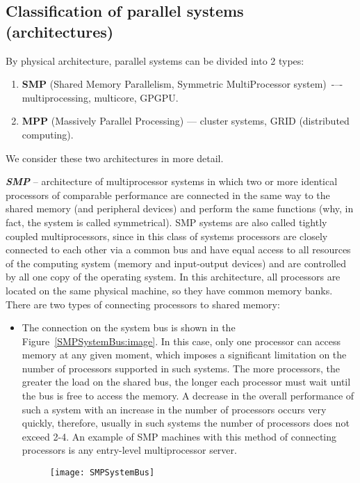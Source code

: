 { %
	\subsection{Classification of parallel systems (architectures)}
	\par By physical architecture, parallel systems can be divided into 2 types:
		\begin{enumerate}
			\item\textbf{SMP} (Shared Memory Parallelism, Symmetric MultiProcessor system)~-–- multiprocessing, multicore, GPGPU. 
			\item\textbf{MPP} (Massively Parallel Processing) –-- cluster systems, GRID (distributed computing).
		\end{enumerate}
	\par We consider these two architectures in more detail.
	\par\textbf{\textit{SMP}}  -- architecture of multiprocessor systems in which two or more identical processors of comparable performance are connected in the same way to the shared memory (and peripheral devices) and perform the same functions (why, in fact, the system is called symmetrical). SMP systems are also called tightly coupled multiprocessors, since in this class of systems processors are closely connected to each other via a common bus and have equal access to all resources of the computing system (memory and input-output devices) and are controlled by all one copy of the operating system. In this architecture, all processors are located on the same physical machine, so they have common memory banks. There are two types of connecting processors to shared memory:
		\begin{itemize}
			\item The connection on the system bus is shown in the Figure~\ref{SMPSystemBus:image}. In this case, only one processor can access memory at any given moment, which imposes a significant limitation on the number of processors supported in such systems. The more processors, the greater the load on the shared bus, the longer each processor must wait until the bus is free to access the memory. A decrease in the overall performance of such a system with an increase in the number of processors occurs very quickly, therefore, usually in such systems the number of processors does not exceed 2-4. An example of SMP machines with this method of connecting processors is any entry-level multiprocessor server.
				\begin{figure}[H]
					\texttt{[image: SMPSystemBus]}

\end{figure}
\end{itemize}}
